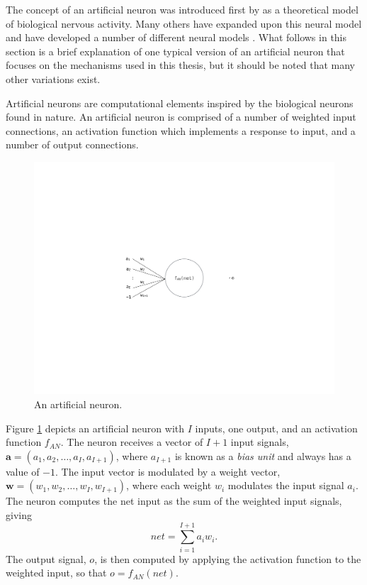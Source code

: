 \documentclass[master]{outhesis}
\begin{document}
The concept of an artificial neuron was introduced first by \citet{McCulloch:1943aa} as a theoretical model of biological nervous activity.
Many others have expanded upon this neural model and have developed a number of different neural models \citep{Engelbrecht:2007aa}.
What follows in this section is a brief explanation of one typical version of an artificial neuron that focuses on the mechanisms used in this thesis,
but it should be noted that many other variations exist.

Artificial neurons are computational elements inspired by the biological neurons found in nature.
An artificial neuron is comprised of a number of weighted input connections, an activation function which implements a response to input, and a number of output connections.

\begin{figure}[H]
	\centering
	\includegraphics{ArtificialNeuron.pdf}
	\caption{An artificial neuron.}
	\label{fig:neuron}
\end{figure}

Figure \ref{fig:neuron} depicts an artificial neuron with $I$ inputs, one output, and an activation function $f_{AN}$. The neuron receives a vector of $I+1$ input signals, $\mathbf{a}=(a_1, a_2, \ldots, a_I, a_{I+1})$, where $a_{I+1}$ is known as a \emph{bias unit} and always has a value of $-1$.  The input vector is modulated by a weight vector, $\mathbf{w}=(w_1, w_2, \ldots, w_I, w_{I+1})$, where each weight $w_i$ modulates the input signal $a_i$. The neuron computes the net input as the sum of the weighted input signals, giving
\begin{displaymath}
net=\sum_{i=1}^{I+1}a_iw_i.
\end{displaymath}
The output signal, $o$, is then computed by applying the activation function to the weighted input, so that $o=f_{AN}(net)$.
\end{document}

